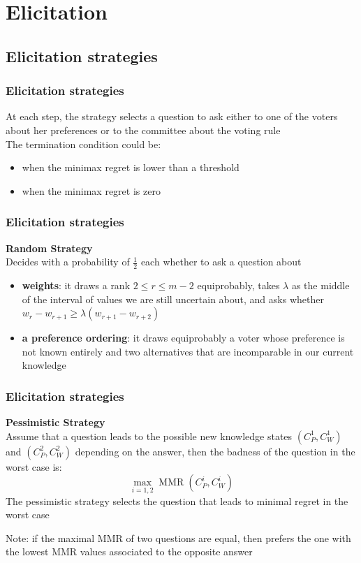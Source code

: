\documentclass{beamer}
\DeclareMathOperator{\MMR}{MMR}
\begin{document}
\section{Elicitation}
	
	\subsection{Elicitation strategies}
	\begin{frame}
		\frametitle{Elicitation strategies}
		At each step, the strategy selects a question to ask either to one of the voters about her preferences or to the committee about the voting rule \\ \bigskip
		\onslide<2-> The termination condition could be:
		\begin{itemize}
			\item <3-> when the minimax regret is lower than a threshold
			\item <4-> when the minimax regret is zero
		\end{itemize}
		\bigskip
	\end{frame}

	\begin{frame}[t]
		\frametitle{Elicitation strategies}
		\textbf{Random Strategy} \\
		\bigskip
		\onslide<2-> Decides with a probability of $\frac{1}{2}$ each whether to ask a question about
		\bigskip
			\begin{itemize}
				\item<3-> \textbf{weights}: it draws a rank $2 \leq r \leq m-2$ equiprobably, takes $\lambda$ as the middle of the interval of values we are still uncertain about, and asks whether $w_{r}-w_{r+1} \geq \lambda (w_{r+1} - w_{r+2})$
				\item<4-> \textbf{a preference ordering}: it draws equiprobably a voter whose preference is not known entirely and two alternatives that are incomparable in our current knowledge
			\end{itemize}
	\end{frame}	
	
	\begin{frame}[t]
		\frametitle{Elicitation strategies}
		\textbf{Pessimistic Strategy} \\
		\bigskip
		\onslide<2-> Assume that a question leads to the possible new knowledge states $(C_P^1, C_W^1)$ and $(C_P^2, C_W^2)$ depending on the answer, then the badness of the question in the worst case is:
		\[\max_{i=1,2} \MMR(C_P^i, C_W^i) \]
		\onslide<3-> The pessimistic strategy selects the question that leads to minimal regret in the worst case \\
		\bigskip
		\onslide<4-> \begin{block}{Note:}
			if the maximal MMR of two questions are equal, then prefers the one with the lowest MMR values associated to the opposite answer
		\end{block}
	\end{frame}	
	
\end{document}

